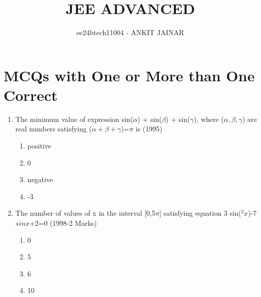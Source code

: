 \documentclass[journal,12pt,twocolumn]{IEEEtran}
\theoremstyle{remark}
\begin{document}

\vspace{3cm}

\title{JEE ADVANCED}
\author{ee24btech11004 - ANKIT JAINAR}
\maketitle
\newpage
\bigskip

\renewcommand{\thefigure}{\theenumi}
\renewcommand{\thetable}{\theenumi}
\section{MCQs with One or More than One Correct}
\begin{enumerate}
\item The minimum value of expression sin($\alpha$) + sin($\beta$) + sin($\gamma$), where ($\alpha,\beta,\gamma$) are real numbers satisfying ($\alpha+\beta+\gamma$)=$\pi$  is \hfill(1995)\
\begin{enumerate}
    \item positive
    \item 0
    \item negative 
    \item -3
\end{enumerate}
\item The number of values of x in the interval [0,5$\pi$] satisfying equation 3 sin($^2x$)-7$sinx$+2=0 (1998-2 Marks) \
\begin{enumerate}
    \item 0
    \item 5
    \item 6
    \item 10
\end{enumerate}


\end{enumerate}
\end{document}

